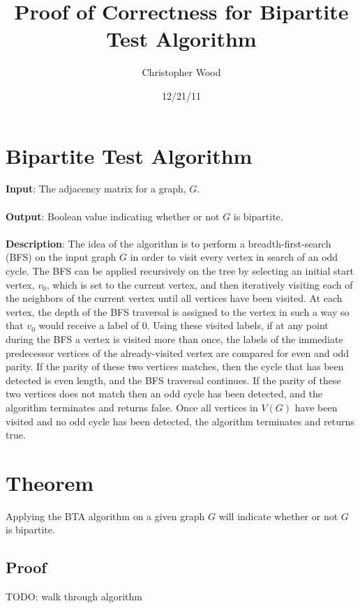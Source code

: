 \documentclass[a4paper,10pt]{article}
\title{Proof of Correctness for Bipartite Test Algorithm}
\author{Christopher Wood}
\date{12/21/11}
\begin{document}
\maketitle

\section{Bipartite Test Algorithm}
{\bf Input}: The adjacency matrix for a graph, $G$. \\ \\
{\bf Output}: Boolean value indicating whether or not $G$ is bipartite. \\ \\
{\bf Description}: The idea of the algorithm is to perform a breadth-first-search (BFS) on the input graph $G$ in order to visit every vertex in search of an odd cycle. The BFS can be applied recursively on the tree by selecting an initial start vertex, $v_{0}$, which is set to the current vertex, and then iteratively visiting each of the neighbors of the current vertex until all vertices have been visited. At each vertex, the depth of the BFS traversal is assigned to the vertex in such a way so that $v_{0}$ would receive a label of $0$. Using these visited labels, if at any point during the BFS a vertex is visited more than once, the labels of the immediate predecessor vertices of the already-visited vertex are compared for even and odd parity. If the parity of these two vertices matches, then the cycle that has been detected is even length, and the BFS traversal continues. If the parity of these two vertices does not match then an odd cycle has been detected, and the algorithm terminates and returns false. Once all vertices in $V(G)$ have been visited and no odd cycle has been detected, the algorithm terminates and returns true. 

\section{Theorem}
Applying the BTA algorithm on a given graph $G$ will indicate whether or not $G$ is bipartite.

\subsection{Proof}
TODO: walk through algorithm

\end{document}
